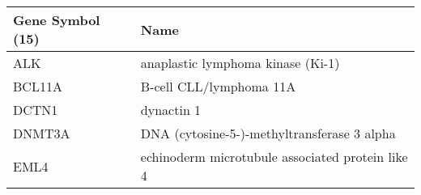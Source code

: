\begin{tabular}{ll}
\toprule
Gene Symbol (15) &                                             Name \\
\midrule
             ALK &                anaplastic lymphoma kinase (Ki-1) \\
          BCL11A &                          B-cell CLL/lymphoma 11A \\
           DCTN1 &                                       dynactin 1 \\
          DNMT3A &      DNA (cytosine-5-)-methyltransferase 3 alpha \\
            EML4 & echinoderm microtubule associated protein like 4 \\
\bottomrule
\end{tabular}
